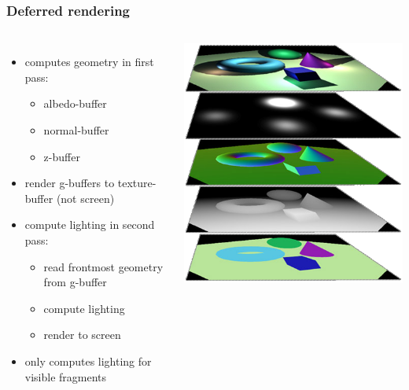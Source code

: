 \documentclass[aspectratio=169]{beamer}
\begin{document}
	\begin{frame}
		\frametitle{Deferred rendering}
		\begin{columns}
				\begin{itemize}
					\item computes geometry in first pass:
						\begin{itemize}
							\item albedo-buffer
							\item normal-buffer
							\item z-buffer
						\end{itemize}
					\item render g-buffers to texture-buffer (not screen)
					\item compute lighting in second pass:
						\begin{itemize}
							\item read frontmost geometry from g-buffer
							\item compute lighting
							\item render to screen
						\end{itemize}
					\item only computes lighting for visible fragments
				\end{itemize}
				\includegraphics[height=.7\textheight]{img/wiki2_deferred_shading.png}
		\end{columns}
	\end{frame}
\end{document}

